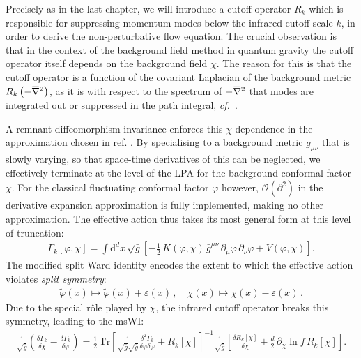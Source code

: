 \documentclass[11pt]{book} %
\newcommand{\overbar}[1]{\mkern 1.5mu\overline{\mkern-1.5mu#1\mkern-1.5mu}\mkern 1.5mu}
\newcommand{\bnabla}{\overbar \nabla}
\newcommand\cf{\textit{cf.}\ }
\newcommand{\eps}{\varepsilon}
\newcommand{\vp}{\varphi}
\newcommand{\dclnf}{\,\partial_\chi\! \ln\! f \,}
\numberwithin{equation}{chapter}
\begin{document}
Precisely as in the last chapter, we will introduce a cutoff operator $R_k$
which is responsible for suppressing momentum modes below the infrared cutoff scale $k$,
in order to derive the non-perturbative flow equation.
The crucial observation is that in the context of the background field method in quantum gravity the
cutoff operator itself depends on the background field $\chi$.
The reason for this is that the cutoff operator is a function of the covariant Laplacian of the
background metric $R_k\left(-\bnabla^2\right)$, as it is with respect to the spectrum of
$-\bnabla^2$ that modes are integrated out or suppressed in the path integral,
\cf \cite{Reuter:2008wj,Reuter:2009kq}.

A remnant diffeomorphism invariance enforces this $\chi$ dependence in the approximation chosen in
ref. \cite{Dietz:2015owa}.
By specialising to a background metric ${\bar g}_{\mu\nu}$ that is slowly varying,
so that space-time derivatives of this can be neglected, we effectively terminate at the level of
the LPA for the background conformal factor $\chi$.
For the classical fluctuating conformal factor $\vp$ however,
$\mathcal{O}(\partial^2)$ in the derivative expansion approximation is fully implemented,
making no other approximation.
The effective action thus takes its most general form at this level of truncation:
\begin{align}
  \Gamma_k[\varphi, \chi] = \int \mathrm d^dx \, \sqrt{\bar g}
  \left[
    - \frac{1}{2} \, K(\varphi,\chi) \, \bar g^{\mu\nu} \, \partial_{\mu}\varphi \, \partial_{\nu}\varphi
    + V(\varphi,\chi)
  \right] .
  \label{trunc}
\end{align}
The modified split Ward identity encodes the extent to which the effective action violates
\textit{split symmetry}:
\begin{align}
  \tilde \vp(x) \mapsto \tilde \vp(x) + \eps(x) \,, \quad \chi(x) \mapsto \chi(x) -\eps(x)\,.
  \label{equ:split-symmetry}
\end{align}
Due to the special r\^ole played by $\chi$, the infrared cutoff operator breaks this symmetry,
leading to the msWI:
\begin{align}
  \frac{1}{\sqrt{\bar g}}
  \left(
    \frac{\delta\Gamma_k}{\delta \chi} - \frac{\delta \Gamma_k}{\delta \vp}
  \right)
  = \frac{1}{2} \, \mathrm{Tr}
  \left[
    \frac{1}{\sqrt{\bar g}\sqrt{\bar g}}\frac{\delta^2\Gamma_k}
    {\delta \vp \delta \vp}+ R_k[\chi]
  \right]^{-1}
  \frac{1}{\sqrt{\bar g}}
  \left[
    \frac{\delta R_k[\chi] }{\delta \chi}+\frac{d}{2}\dclnf R_k[\chi]
  \right] .
  \label{equ:sWiGamma}
\end{align}
\end{document}
